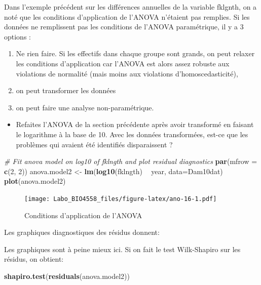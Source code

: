 \documentclass[12pt,]{book}
\newenvironment{Shaded}{\begin{snugshade}}{\end{snugshade}}
\newcommand{\CommentTok}[1]{\textcolor[rgb]{0.37,0.37,0.37}{\textit{#1}}}
\newcommand{\DataTypeTok}[1]{\textcolor[rgb]{0.27,0.27,0.27}{#1}}
\newcommand{\DecValTok}[1]{\textcolor[rgb]{0.06,0.06,0.06}{#1}}
\newcommand{\KeywordTok}[1]{\textcolor[rgb]{0.27,0.27,0.27}{\textbf{#1}}}
\newcommand{\NormalTok}[1]{#1}
\newcommand{\OperatorTok}[1]{\textcolor[rgb]{0.43,0.43,0.43}{\textbf{#1}}}
\newcommand{\StringTok}[1]{\textcolor[rgb]{0.5,0.5,0.5}{#1}}
\providecommand{\tightlist}{%
  \setlength{\itemsep}{0pt}\setlength{\parskip}{0pt}}
\begin{document}
Dans l'exemple précédent sur les différences annuelles de la variable fklgnth, on a noté que les conditions d'application de l'ANOVA n'étaient pas remplies. Si les données ne remplissent pas les conditions de l'ANOVA paramétrique, il y a 3 options :

\begin{enumerate}
\def\labelenumi{\arabic{enumi}.}
\tightlist
\item
  Ne rien faire. Si les effectifs dans chaque groupe sont grands, on peut relaxer les conditions d'application car l'ANOVA est alors assez robuste aux violations de normalité (mais moins aux violations d'homoscedasticité),
\item
  on peut transformer les données
\item
  on peut faire une analyse non-paramétrique.
\end{enumerate}

\begin{itemize}
\tightlist
\item
  Refaites l'ANOVA de la section précédente après avoir transformé en faisant le logarithme à la base de 10. Avec les données transformées, est-ce que les problèmes qui avaient été identifiés disparaissent ?
\end{itemize}

\begin{Shaded}
\begin{Highlighting}[]
\CommentTok{# Fit anova model on log10 of fklngth and plot residual diagnostics}
\KeywordTok{par}\NormalTok{(}\DataTypeTok{mfrow =} \KeywordTok{c}\NormalTok{(}\DecValTok{2}\NormalTok{, }\DecValTok{2}\NormalTok{))}
\NormalTok{anova.model2 <-}\StringTok{ }\KeywordTok{lm}\NormalTok{(}\KeywordTok{log10}\NormalTok{(fklngth) }\OperatorTok{~}\StringTok{ }\NormalTok{year, }\DataTypeTok{data=}\NormalTok{Dam10dat)}
\KeywordTok{plot}\NormalTok{(anova.model2)}
\end{Highlighting}
\end{Shaded}

\begin{figure}
\centering
\texttt{[image: Labo\_BIO4558\_files/figure-latex/ano-16-1.pdf]}
\caption{\label{fig:ano-16}Conditions d'application de l'ANOVA}
\end{figure}

Les graphiques diagnostiques des résidus donnent:

Les graphiques sont à peine mieux ici. Si on fait le test Wilk-Shapiro sur les résidus, on obtient:

\begin{Shaded}
\begin{Highlighting}[]
\KeywordTok{shapiro.test}\NormalTok{(}\KeywordTok{residuals}\NormalTok{(anova.model2))}
\end{Highlighting}
\end{Shaded}
\end{document}
